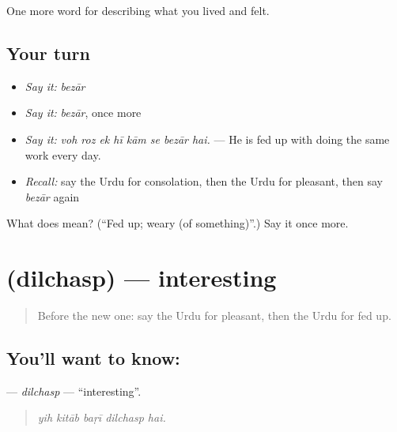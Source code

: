 \begin{grammarlens}[title={What you've built}]
One more word for describing what you lived and felt.
\end{grammarlens}

\subsection*{Your turn}
\begin{itemize}
\raggedright
  \item \emph{Say it:} \emph{bezār}
  \item \emph{Say it:} \emph{bezār}, once more
  \item \emph{Say it:} \emph{voh roz ek hī kām se bezār hai.} — He is fed up with doing the same work every day.
  \item \emph{Recall:} say the Urdu for consolation, then the Urdu for pleasant, then say \emph{bezār} again
\end{itemize}

\begin{tcolorbox}[breakable,colback=teal!4,colframe=teal!35!black,title={Before you move on}]
What does  mean? (\textquotedblleft{}Fed up; weary (of something)\textquotedblright{}.) Say it once more.
\end{tcolorbox}
\section[\texorpdfstring{\ur{دلچسپ} (dilchasp)}{دلچسپ (dilchasp)}]{ (dilchasp) — interesting}

\label{lesson:UR-C448-dilchasp}



\begin{quote}
Before the new one: say the Urdu for pleasant, then the Urdu for fed up.
\end{quote}

\subsection*{You'll want to know: }
\textbf{} — \emph{dilchasp} — \textquotedblleft{}interesting\textquotedblright{}.

\begin{quote}
    
\end{quote}

\begin{quote}
\emph{yih kitāb baṛī dilchasp hai.}
\end{quote}

